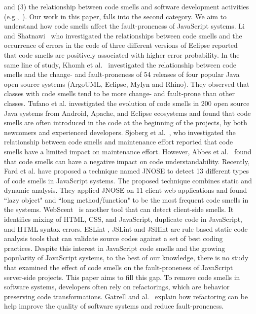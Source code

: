 \documentclass[smallcondensed]{svjour3}
\begin{document}
and (3) the relationship between code smells and software development activities (e.g.,~\cite{Sjoberg13QEC,Abbes11}).  
Our work in this paper, falls into the second category. We aim to understand how code smells affect the fault-proneness of JavaScript systems. Li and Shatnawi~\cite{shatnawi2006investigation} who investigated the relationships between code smells and the occurrence of errors in the code of three different versions of Eclipse reported that code smells are positively associated with higher error probability. In the same line of study, Khomh et al.~\cite{khomh2012exploratory} investigated the relationship between code smells and the change- and fault-proneness of 54 releases of four popular Java open source systems (ArgoUML, Eclipse, Mylyn and Rhino). They observed that classes with code smells tend to be more change- and fault-prone than other classes. Tufano et al. \cite{tufano2015and} investigated the evolution of code smells in 200 open source Java systems from Android, Apache, and Eclipse ecosystems and found that code smells are often introduced in the code at the beginning of the projects, by both newcomers and experienced developers. Sjoberg et al.~\cite{Sjoberg13QEC}, who investigated the relationship between code smells and maintenance effort reported that code smells have a limited impact on maintenance effort. However, Abbes et al.~\cite{Abbes11} found that code smells can have a negative impact on code understandability. Recently, Fard et al. \cite{fard2013jsnose} have proposed a technique named JNOSE to detect 13 different types of code smells in JavaScript systems. The proposed technique combines static and dynamic analysis. They applied JNOSE on 11 client-web applications and found ``lazy object" and ``long method/function" to be the most frequent code smells in the systems. WebScent~\cite{nguyen2012detection} is another tool that can detect client-side smells. It identifies mixing of HTML, CSS, and JavaScript, duplicate code in JavaScript, and HTML syntax errors. ESLint \cite{ESLint}, JSLint \cite{JslinT} and JSHint \cite{JSHint} are rule based static code analysis tools that can validate source codes against a set of best coding practices. Despite this interest in JavaScript code smells and the growing popularity of JavaScript systems, to the best of our knowledge, there is no study that examined the effect of code smells on the fault-proneness of JavaScript server-side projects. This paper aims to fill this gap. {\color{blue}To remove code smells in software systems, developers often rely on refactorings, which are behavior preserving code transformations. Gatrell and al.~\cite{gatrell2015effect} explain how refactoring can be help improve the quality of software systems and reduce fault-proneness. } %
\end{document}
